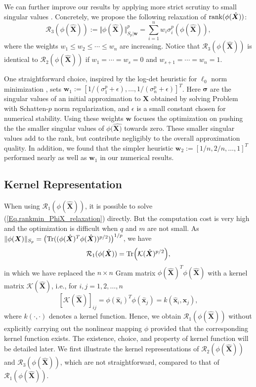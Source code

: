\documentclass[letterpaper]{article} %
\begin{document}
We can further improve our results by applying more strict scrutiny
to small singular values
\cite{xie2016weighted}.
Concretely, we propose the following relaxation of $\textup{rank}(\phi(\hat{\bm{X}}))$:
\begin{equation}
\mathcal{R}_3(\phi(\hat{\bm{X}})):=\Vert \phi(\hat{\bm{X}})\Vert_{S_p\vert \bm{w}}^p=\sum_{i=1}^nw_i \sigma_i^{p}(\phi(\hat{\bm{X}})),
\end{equation}
where the weights
$w_1\leq w_2\leq\cdots \leq w_n$ are increasing.
Notice that $\mathcal{R}_3(\phi(\hat{\bm{X}}))$ is identical to $\mathcal{R}_2(\phi(\hat{\bm{X}}))$ if $w_1=\cdots=w_s=0$ and $w_{s+1}=\cdots=w_n=1$.

One straightforward choice,
inspired by the log-det heuristic for $\ell_0$ norm minimization \cite{fazel2003log},
sets $\bm{w}_1:=[1/(\sigma_1^p+\epsilon),\ldots,1/(\sigma_n^p+\epsilon)]^T$.
Here $\bm{\sigma}$ are the singular values of an initial approximation to $\bm{X}$
obtained by solving Problem \label{Eq.rankmin_PhiX_relaxation} with Schatten-$p$ norm regularization, and
$\epsilon$ is a small constant chosen for numerical stability.
Using these weights $\bm{w}$ focuses the optimization on pushing the
the smaller singular values of $\phi(\hat{\bm{X})}$ towards zero.
These smaller singular values add to the rank, but contribute negligibly to the overall approximation quality.
In addition, we found that the simpler heuristic $\bm{w}_2:=[1/n,2/n,\ldots,1]^T$
performed nearly as well as $\bm{w}_1$ in our numerical results.

\subsection{Kernel Representation}
When using $\mathcal{R}_1(\phi(\hat{\bm{X}}))$, it is possible to solve (\ref{Eq.rankmin_PhiX_relaxation}) directly. But the computation cost is very high and the optimization is difficult when $q$ and $m$ are not small. As $\Vert \phi(\bm{X})\Vert_{S_p}=\big(\textup{Tr}((\phi(\hat{\bm{X}})^T\phi(\hat{\bm{X}}))^{p/2})\big)^{1/p}$, we have
\begin{equation}\label{Eq.Spmin_trace}
\mathcal{R}_1(\phi(\hat{\bm{X}}))=\textup{Tr}\Big(\mathcal{K}(\hat{\bm{X}})^{p/2}\Big),
\end{equation}
in which we have replaced the $n\times n$ Gram matrix $\phi(\hat{\bm{X}})^T\phi(\hat{\bm{X}})$ with a kernel matrix $\mathcal{K}(\hat{\bm{X}})$, i.e., for $i,j=1,2,\ldots,n$
$$[\mathcal{K}(\hat{\bm{X}})]_{ij}=\phi(\hat{\bm{x}}_i)^T\phi(\hat{\bm{x}}_j)=k(\hat{\bm{x}}_i,\hat{\bm{x}}_j),
$$
where $k(\cdot,\cdot)$ denotes a kernel function. Hence, we obtain $\mathcal{R}_1(\phi(\hat{\bm{X}}))$ without explicitly carrying out the nonlinear mapping $\phi$ provided that the corresponding kernel function exists. The existence, choice, and  property of kernel function will be detailed later. We first illustrate the kernel representations of $\mathcal{R}_2(\phi(\hat{\bm{X}}))$ and $\mathcal{R}_3(\phi(\hat{\bm{X}}))$, which are not straightforward, compared to that of $\mathcal{R}_1(\phi(\hat{\bm{X}}))$.
\end{document}
